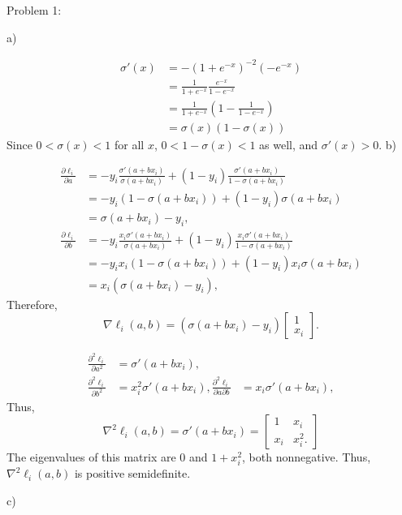 \documentclass[12pt]{amsart}
\begin{document}
    Problem 1:

    a)

    \begin{align*}
        \sigma'(x) &= -(1+e^{-x})^{-2}(-e^{-x})\\
        &= \frac{1}{1+e^{-x}}\frac{e^{-x}}{1 - e^{-x}}\\
        &= \frac{1}{1+e^{-x}}\left(1 - \frac{1}{1 - e^{-x}}\right)\\
        &= \sigma(x)(1-\sigma(x))
    \end{align*}
    Since $0<\sigma(x)<1$ for all $x$, $0<1-\sigma(x)<1$ as well, and $\sigma'(x)>0$.
    b)

    \begin{align*}
    \frac{\partial\ell_i}{\partial a}
    &= -y_i\frac{\sigma'(a+bx_i)}{\sigma(a+bx_i)}
    + (1-y_i)\frac{\sigma'(a+bx_i)}{1 - \sigma(a+bx_i)}\\
    &= -y_i(1-\sigma(a+bx_i)) + (1-y_i)\sigma(a+bx_i)\\
    &= \sigma(a+bx_i) - y_i,\\
    \frac{\partial\ell_i}{\partial b}
    &= -y_i\frac{x_i\sigma'(a+bx_i)}{\sigma(a+bx_i)}
    + (1-y_i)\frac{x_i\sigma'(a+bx_i)}{1 - \sigma(a+bx_i)}\\
    &= -y_ix_i(1-\sigma(a+bx_i)) + (1-y_i)x_i\sigma(a+bx_i)\\
    &= x_i(\sigma(a+bx_i) - y_i),
    \end{align*}
    Therefore,
    \[
        \nabla \ell_i(a, b) = (\sigma(a+bx_i) - y_i)\begin{bmatrix}
            1\\x_i
        \end{bmatrix}.
    \]

    \begin{align*}
        \frac{\partial^2\ell_i}{\partial a^2} &= \sigma'(a+bx_i),\\
        \frac{\partial^2\ell_i}{\partial b^2} &= x_i^2\sigma'(a+bx_i),
        \frac{\partial^2\ell_i}{\partial a\partial b} &= x_i\sigma'(a+bx_i),
    \end{align*}
    Thus,
    \[
        \nabla^2\ell_i(a, b) = \sigma'(a+bx_i) = \begin{bmatrix}
            1&x_i\\x_i&x_i^2.
        \end{bmatrix}
    \]
    The eigenvalues of this matrix are $0$ and $1+x_i^2$, both nonnegative.
    Thus, $\nabla^2\ell_i(a, b)$ is positive semidefinite.


    c)
\end{document}
